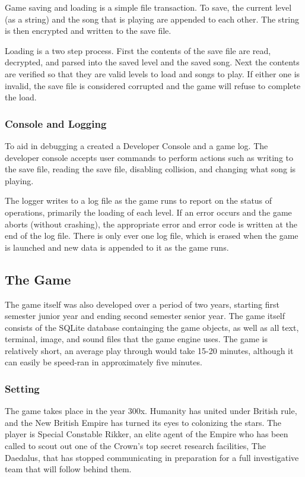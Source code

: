 \documentclass{article}
\begin{document}
Game saving and loading is a simple file transaction. To save, the current level (as a string) and the song that is playing are appended to each other. The string is then encrypted and written to the save file.

Loading is a two step process. First the contents of the save file are read, decrypted, and parsed into the saved level and the saved song. Next the contents are verified so that they are valid levels to load and songs to play. If either one is invalid, the save file is considered corrupted and the game will refuse to complete the load.

\subsubsection{Console and Logging} \label{subsubsec:console}

To aid in debugging a created a Developer Console and a game log. The developer console accepts user commands to perform actions such as writing to the save file, reading the save file, disabling collision, and changing what song is playing.

The logger writes to a log file as the game runs to report on the status of operations, primarily the loading of each level. If an error occurs and the game aborts (without crashing), the appropriate error and error code is written at the end of the log file. There is only ever one log file, which is erased when the game is launched and new data is appended to it as the game runs.

\subsection{The Game} \label{subsec:thegame}

The game itself was also developed over a period of two years, starting first semester junior year and ending second semester senior year. The game itself consists of the SQLite database containging the game objects, as well as all text, terminal, image, and sound files that the game engine uses. The game is relatively short, an average play through would take 15-20 minutes, although it can easily be speed-ran in approximately five minutes.

\subsubsection{Setting} \label{subsubsec:setting}

The game takes place in the year 300x. Humanity has united under British rule, and the New British Empire has turned its eyes to colonizing the stars. The player is Special Constable Rikker, an elite agent of the Empire who has been called to scout out one of the Crown's top secret research facilities, The Daedalus, that has stopped communicating in preparation for a full investigative team that will follow behind them.
\end{document}
